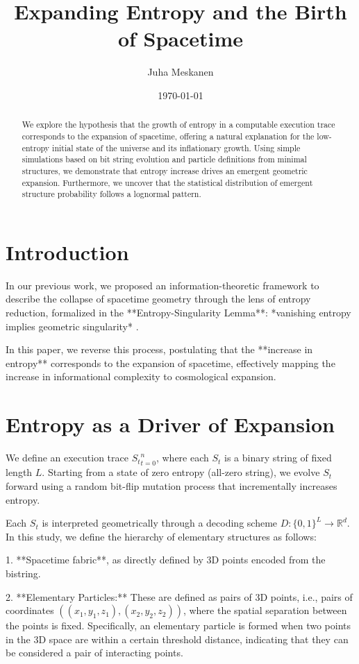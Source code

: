 \documentclass[11pt]{article}
\title{Expanding Entropy and the Birth of Spacetime}
\author{Juha Meskanen}
\date{\today}
\begin{document}
\maketitle
\fi


\begin{abstract}
   We explore the hypothesis that the growth of entropy in a computable execution trace corresponds to the expansion of spacetime,
   offering a natural explanation for the low-entropy initial state of the universe and its inflationary growth. Using simple simulations
   based on bit string evolution and particle definitions from minimal structures, we demonstrate that entropy
   increase drives an emergent geometric expansion. Furthermore, we uncover that the statistical distribution of emergent
   structure probability follows a lognormal pattern.
\end{abstract}

\section{Introduction}

In our previous work, we proposed an information-theoretic framework to describe the collapse of spacetime geometry through
the lens of entropy reduction, formalized in the **Entropy-Singularity Lemma**: *vanishing entropy implies geometric
singularity* \cite{Paper1}.

In this paper, we reverse this process, postulating that the **increase in entropy** corresponds to the expansion of spacetime,
effectively mapping the increase in informational complexity to cosmological expansion.


\section{Entropy as a Driver of Expansion}
We define an execution trace ${S_t}_{t=0}^n$, where each $S_t$ is a binary string of fixed length $L$.
Starting from a state of zero entropy (all-zero string), we evolve $S_t$ forward using a random bit-flip mutation process that
incrementally increases entropy.

Each $S_t$ is interpreted geometrically through a decoding scheme $D: \{0,1\}^L \to \mathbb{R}^d$. In this study,
we define the hierarchy of elementary structures as follows:

1. **Spacetime fabric**, as directly defined by 3D points encoded from the bistring.

2. **Elementary Particles:** These are defined as pairs of 3D points, i.e., pairs of
coordinates $((x_1, y_1, z_1), (x_2, y_2, z_2))$, where the spatial separation between the
points is fixed. Specifically, an elementary particle is formed when two points in the 3D space are within
a certain threshold distance, indicating that they can be considered a pair of interacting points.
\end{document}
